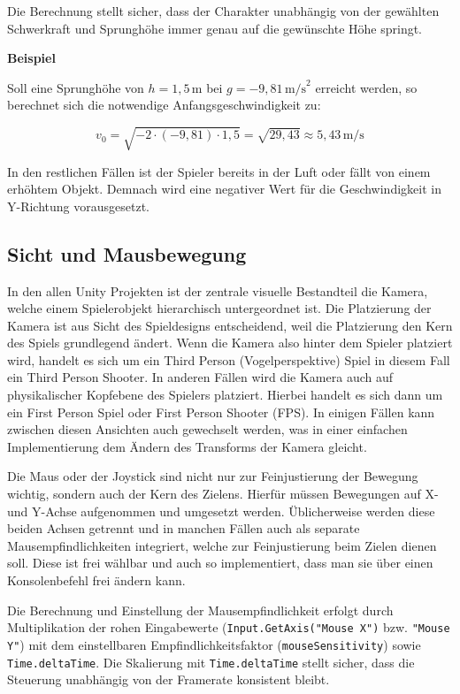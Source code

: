 Die Berechnung stellt sicher, dass der Charakter unabhängig von der gewählten Schwerkraft und Sprunghöhe immer genau auf die gewünschte Höhe springt.

\textbf{Beispiel}

Soll eine Sprunghöhe von $h = 1{,}5\,\text{m}$ bei $g = -9{,}81\,\text{m/s}^2$ erreicht werden, so berechnet sich die notwendige Anfangsgeschwindigkeit zu:

\[
v_0 = \sqrt{ -2 \cdot (-9{,}81)\cdot 1{,}5 } = \sqrt{ 29{,}43 } \approx 5{,}43\,\text{m/s}
\]

In den restlichen Fällen ist der Spieler bereits in der Luft oder fällt von einem erhöhtem Objekt. Demnach wird eine negativer Wert für die Geschwindigkeit in Y-Richtung vorausgesetzt. 

\subsection{Sicht und Mausbewegung}
\label{Mausbewegung}
In den allen Unity Projekten ist der zentrale visuelle Bestandteil die Kamera, welche einem Spielerobjekt hierarchisch untergeordnet ist. Die Platzierung der Kamera ist aus Sicht des Spieldesigns entscheidend, weil die Platzierung den Kern des Spiels grundlegend ändert. Wenn die Kamera also hinter dem Spieler platziert wird, handelt es sich um ein Third Person (Vogelperspektive) Spiel in diesem Fall ein Third Person Shooter. In anderen Fällen wird die Kamera auch auf physikalischer Kopfebene des Spielers platziert. Hierbei handelt es sich dann um ein First Person Spiel oder First Person Shooter (FPS). In einigen Fällen kann zwischen diesen Ansichten auch gewechselt werden, was in einer einfachen Implementierung dem Ändern des Transforms der Kamera gleicht.

Die Maus oder der Joystick sind nicht nur zur Feinjustierung der Bewegung wichtig, sondern auch der Kern des Zielens. Hierfür müssen Bewegungen auf X- und Y-Achse aufgenommen und umgesetzt werden. 
Üblicherweise werden diese beiden Achsen getrennt und in manchen Fällen auch als separate Mausempfindlichkeiten integriert, welche zur Feinjustierung beim Zielen dienen soll. Diese ist frei wählbar und auch so implementiert, dass man sie über einen Konsolenbefehl frei ändern kann.

Die Berechnung und Einstellung der Mausempfindlichkeit erfolgt durch Multiplikation der rohen Eingabewerte (\texttt{Input.GetAxis("Mouse X")} bzw. \texttt{"Mouse Y"}) mit dem einstellbaren Empfindlichkeitsfaktor (\texttt{mouseSensitivity}) sowie \texttt{Time.deltaTime}. Die Skalierung mit \texttt{Time.deltaTime} stellt sicher, dass die Steuerung unabhängig von der Framerate konsistent bleibt.

